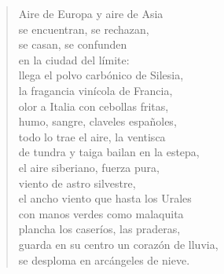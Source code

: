 \documentclass[12pt]{article}
\begin{document}
\clearpage
{}
\begin{verse}

Aire de Europa y aire de Asia\\
se encuentran, se rechazan,\\
se casan, se confunden\\
en la ciudad del límite:\\
llega el polvo carbónico de Silesia,\\
la fragancia vinícola de Francia,\\
olor a Italia con cebollas fritas,\\
humo, sangre, claveles españoles,\\
todo lo trae el aire, la ventisca\\
de tundra y taiga bailan en la estepa,\\
el aire siberiano, fuerza pura,\\
viento de astro silvestre,\\
el ancho viento que hasta los Urales\\
con manos verdes como malaquita\\
plancha los caseríos, las praderas,\\
guarda en su centro un corazón de lluvia,\\
se desploma en arcángeles de nieve.  

\end{verse}
\end{document}

